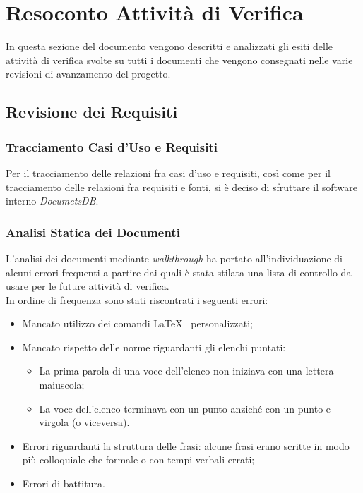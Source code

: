 \section{Resoconto Attività di Verifica}
In questa sezione del documento vengono descritti e analizzati gli esiti delle attività di verifica svolte su tutti i documenti che vengono consegnati nelle varie revisioni di avanzamento del progetto.

\subsection{Revisione dei Requisiti}


\subsubsection{Tracciamento Casi d’Uso e Requisiti}
Per il tracciamento delle relazioni fra casi d’uso e requisiti, così come per il tracciamento delle relazioni fra requisiti e fonti, si è deciso di sfruttare il software interno \textit{DocumetsDB}.

\subsubsection{Analisi Statica dei Documenti}
L'analisi dei documenti mediante \textit{walkthrough} ha portato all'individuazione di alcuni errori frequenti a partire dai quali è stata stilata una lista di controllo da usare per le future attività di verifica. \\
In ordine di frequenza sono stati riscontrati i seguenti errori:
\begin{itemize}
\item Mancato utilizzo dei comandi \LaTeX~ personalizzati;
\item Mancato rispetto delle norme riguardanti gli elenchi puntati:
\begin{itemize}
\item La prima parola di una voce dell'elenco non iniziava con una lettera maiuscola;
\item La voce dell'elenco terminava con un punto anziché con un punto e virgola (o viceversa).
\end{itemize}
\item Errori riguardanti la struttura delle frasi: alcune frasi erano scritte in modo più colloquiale che formale o con tempi verbali errati;
\item Errori di battitura.
\end{itemize}

